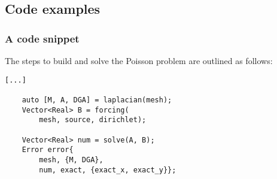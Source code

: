 \subsection{Code examples}

\begin{frame}[fragile]
    \frametitle{A code snippet}

    The steps to build and solve the Poisson problem are outlined as follows:

    \begin{lstlisting}[style=cpp]
    [...]

    auto [M, A, DGA] = laplacian(mesh);
    Vector<Real> B = forcing(
        mesh, source, dirichlet);

    Vector<Real> num = solve(A, B);
    Error error{
        mesh, {M, DGA}, 
        num, exact, {exact_x, exact_y}};
    \end{lstlisting}

\end{frame}